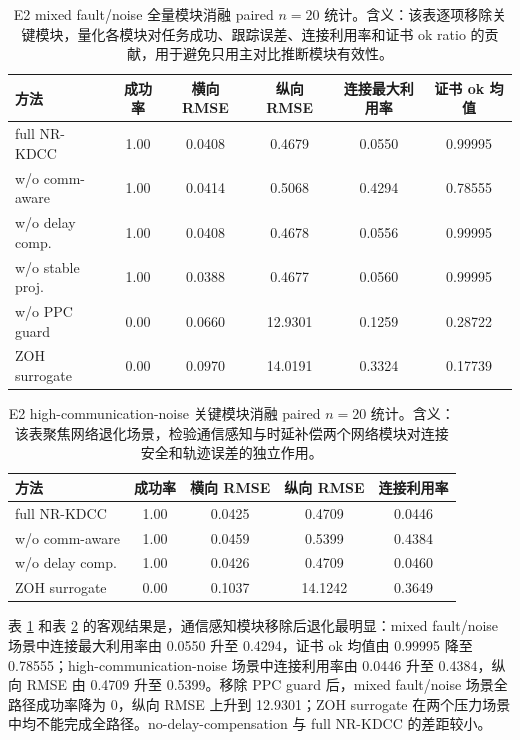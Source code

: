 \documentclass[twocolumn,3p,times,procedia]{elsarticle}
\newcommand{\Method}{NR-KDCC}
\begin{document}
\begin{table}[!t]
\centering
\caption{E2 mixed fault/noise 全量模块消融 paired $n=20$ 统计。含义：该表逐项移除关键模块，量化各模块对任务成功、跟踪误差、连接利用率和证书 ok ratio 的贡献，用于避免只用主对比推断模块有效性。}
\label{tab:e2_mixed}
\footnotesize
\begin{tabular}{lccccc}
\toprule
方法 & 成功率 & 横向 RMSE & 纵向 RMSE & 连接最大利用率 & 证书 ok 均值 \\
\midrule
full \Method{} & 1.00 & 0.0408 & 0.4679 & 0.0550 & 0.99995\\
w/o comm-aware & 1.00 & 0.0414 & 0.5068 & 0.4294 & 0.78555\\
w/o delay comp. & 1.00 & 0.0408 & 0.4678 & 0.0556 & 0.99995\\
w/o stable proj. & 1.00 & 0.0388 & 0.4677 & 0.0560 & 0.99995\\
w/o PPC guard & 0.00 & 0.0660 & 12.9301 & 0.1259 & 0.28722\\
ZOH surrogate & 0.00 & 0.0970 & 14.0191 & 0.3324 & 0.17739\\
\bottomrule
\end{tabular}
\end{table}

\begin{table}[!t]
\centering
\caption{E2 high-communication-noise 关键模块消融 paired $n=20$ 统计。含义：该表聚焦网络退化场景，检验通信感知与时延补偿两个网络模块对连接安全和轨迹误差的独立作用。}
\label{tab:e2_comm}
\footnotesize
\begin{tabular}{lcccc}
\toprule
方法 & 成功率 & 横向 RMSE & 纵向 RMSE & 连接利用率\\
\midrule
full \Method{} & 1.00 & 0.0425 & 0.4709 & 0.0446\\
w/o comm-aware & 1.00 & 0.0459 & 0.5399 & 0.4384\\
w/o delay comp. & 1.00 & 0.0426 & 0.4709 & 0.0460\\
ZOH surrogate & 0.00 & 0.1037 & 14.1242 & 0.3649\\
\bottomrule
\end{tabular}
\end{table}

表 \ref{tab:e2_mixed} 和表 \ref{tab:e2_comm} 的客观结果是，通信感知模块移除后退化最明显：mixed fault/noise 场景中连接最大利用率由 0.0550 升至 0.4294，证书 ok 均值由 0.99995 降至 0.78555；high-communication-noise 场景中连接利用率由 0.0446 升至 0.4384，纵向 RMSE 由 0.4709 升至 0.5399。移除 PPC guard 后，mixed fault/noise 场景全路径成功率降为 0，纵向 RMSE 上升到 12.9301；ZOH surrogate 在两个压力场景中均不能完成全路径。no-delay-compensation 与 full \Method{} 的差距较小。
\end{document}
